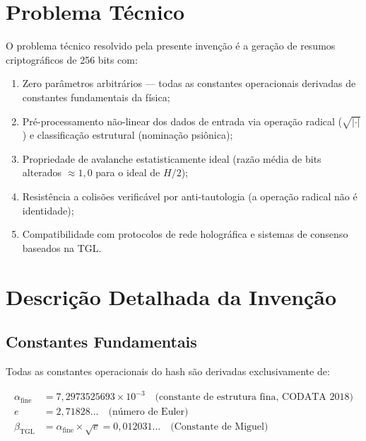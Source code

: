 \documentclass[12pt,a4paper]{article}
\newcommand{\betatgl}{\beta_{\!\scriptscriptstyle\mathrm{TGL}}}
\newcommand{\afine}{\alpha_{\mathrm{fine}}}
\begin{document}
\section{Problema Técnico}

O problema técnico resolvido pela presente invenção é a geração de resumos criptográficos de 256 bits com:

\begin{enumerate}[nosep]
\item Zero parâmetros arbitrários --- todas as constantes operacionais derivadas de constantes fundamentais da física;
\item Pré-processamento não-linear dos dados de entrada via operação radical ($\sqrt{|\cdot|}$) e classificação estrutural (nominação psiônica);
\item Propriedade de avalanche estatisticamente ideal (razão média de bits alterados $\approx 1{,}0$ para o ideal de $H/2$);
\item Resistência a colisões verificável por anti-tautologia (a operação radical não é identidade);
\item Compatibilidade com protocolos de rede holográfica e sistemas de consenso baseados na TGL.
\end{enumerate}

\section{Descrição Detalhada da Invenção}

\subsection{Constantes Fundamentais}

Todas as constantes operacionais do hash são derivadas exclusivamente de:

\begin{align}
\afine &= 7{,}2973525693 \times 10^{-3} \quad \text{(constante de estrutura fina, CODATA 2018)} \\
e &= 2{,}71828\ldots \quad \text{(número de Euler)} \\
\betatgl &= \afine \times \sqrt{e} = 0{,}012031\ldots \quad \text{(Constante de Miguel)}
\end{align}
\end{document}
